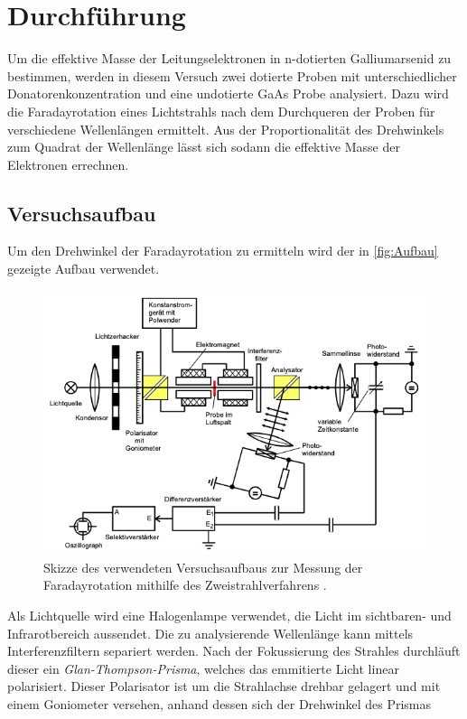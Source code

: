 \section{Durchführung}
\label{sec:Durchführung}
Um die effektive Masse der Leitungselektronen in n-dotierten Galliumarsenid zu bestimmen, werden in diesem Versuch zwei dotierte Proben mit unterschiedlicher 
Donatorenkonzentration und eine undotierte GaAs Probe analysiert. Dazu wird die Faradayrotation eines Lichtstrahls nach dem Durchqueren der Proben für 
verschiedene Wellenlängen ermittelt. Aus der Proportionalität des Drehwinkels zum Quadrat der Wellenlänge lässt sich sodann die effektive Masse der Elektronen
errechnen.

\subsection{Versuchsaufbau}
\label{subsec:Versuchsaufbau}
Um den Drehwinkel der Faradayrotation zu ermitteln wird der in \autoref{fig:Aufbau} gezeigte Aufbau verwendet.
\begin{figure}
    \centering
    \includegraphics[width=\textwidth]{content/pics/Aufbau.png}
    \caption{Skizze des verwendeten Versuchsaufbaus zur Messung der Faradayrotation mithilfe des Zweistrahlverfahrens \cite{V46}.}
    \label{fig:Aufbau}
\end{figure}
Als Lichtquelle wird eine Halogenlampe verwendet, die Licht im sichtbaren- und Infrarotbereich aussendet. Die zu analysierende Wellenlänge kann mittels 
Interferenzfiltern separiert werden. Nach der Fokussierung des Strahles durchläuft dieser ein \textit{Glan-Thompson-Prisma}, welches das emmitierte Licht 
linear polarisiert. Dieser Polarisator ist um die Strahlachse drehbar gelagert und mit einem Goniometer versehen, anhand dessen sich der Drehwinkel des Prismas 
